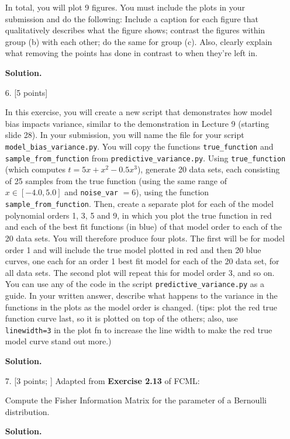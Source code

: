 \documentclass[10pt]{article}
\begin{document}
\begin{itemize}
In total, you will plot 9 figures.  You must include the plots in your submission and do the following: Include a caption for each figure that qualitatively describes what the figure shows; contrast the figures within group (b) with each other; do the same for group (c).  Also, clearly explain what removing the points has done in contrast to when they're left in.

{\bf Solution.}



\item[6.] [5 points]

In this exercise, you will create a new script that demonstrates how model bias impacts variance, similar to the demonstration in Lecture 9 (starting slide 28).  In your submission, you will name the file for your script {\tt model\_bias\_variance.py}.  You will copy the functions {\tt true\_function} and {\tt sample\_from\_function} from {\tt predictive\_variance.py}.  Using {\tt true\_function} (which computes $t = 5x + x^2 - 0.5x^3$), generate 20 data sets, each consisting of 25 samples from the true function (using the same range of $x \in [-4.0, 5.0]$ and {\tt noise\_var} $= 6$), using the function {\tt sample\_from\_function}.  Then, create a separate plot for each of the model polynomial orders 1, 3, 5 and 9, in which you plot the true function in red and each of the best fit functions (in blue) of that model order to each of the 20 data sets.  You will therefore produce four plots.  The first will be for model order 1 and will include the true model plotted in red and then 20 blue curves, one each for an order 1 best fit model for each of the 20 data set, for all data sets.  The second plot will repeat this for model order 3, and so on.  You can use any of the code in the script {\tt predictive\_variance.py} as a guide.  In your written answer, describe what happens to the variance in the functions in the plots as the model order is changed.  (tips: plot the red true function curve last, so it is plotted on top of the others; also, use {\tt linewidth=3} in the plot fn to increase the line width to make the red true model curve stand out more.)

{\bf Solution.} 



\item[7.] [3 points; \boldred{Required only for Graduates}]
Adapted from {\bf Exercise 2.13} of FCML:

Compute the Fisher Information Matrix for the parameter of a Bernoulli distribution.

{\bf Solution.}

\end{itemize}
\end{document}
